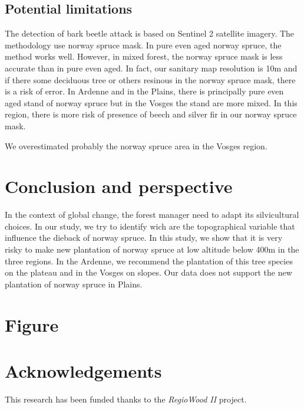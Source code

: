 \documentclass[3p,procedia]{elsarticle}
\begin{document}
\subsection{Potential limitations}
The detection of bark beetle attack is based on Sentinel 2 satellite imagery.
The methodology use norway spruce mask. 
In pure even aged norway spruce, the method works well. 
However, in mixed forest, the norway spruce mask is less accurate than in pure even aged.
In fact, our sanitary map resolution is 10m and if there some deciduous tree or others resinous in the norway spruce mask, there is a risk of error.
In Ardenne and in the Plains, there is principally pure even aged stand of norway spruce but in the Vosges the stand are more mixed.
In this region, there is more risk of presence of beech and silver fir in our norway spruce mask.

We overestimated probably the norway spruce area in the Vosges region.
\section{Conclusion and perspective}

In the context of global change, the forest manager need to adapt its silvicultural choices.
In our study, we try to identify wich are the topographical variable that influence the dieback of norway spruce.
In this study, we show that it is very risky to make new plantation of norway spruce at low altitude below 400m in the three regions.
In the Ardenne, we recommend the plantation of this tree species on the plateau and in the Vosges on slopes. 
Our data does not support the new plantation of norway spruce in Plains. 
\section{Figure}


	


\section{Acknowledgements}

This research has been funded thanks to the \textit{RegioWood II} project.

%

\end{document}
